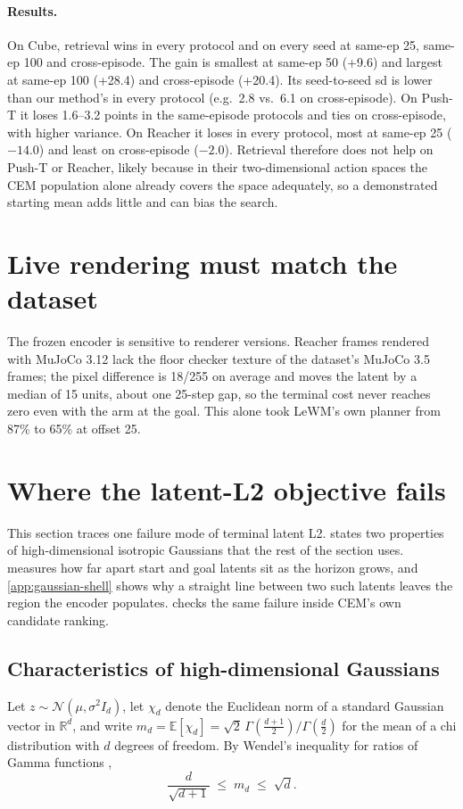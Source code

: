 \documentclass{article} %
\begin{document}
\paragraph{Results.} On Cube, retrieval wins in every protocol and on every seed at
same-ep 25, same-ep 100 and cross-episode. The gain is smallest at same-ep 50 (+9.6) and largest at
same-ep 100 (+28.4) and cross-episode (+20.4). Its seed-to-seed sd is lower than our method's in
every protocol (e.g.\ 2.8 vs.\ 6.1 on cross-episode). On Push-T it loses 1.6--3.2 points in the
same-episode protocols and ties on cross-episode, with higher variance. On Reacher it loses in
every protocol, most at same-ep 25 ($-14.0$) and least on cross-episode ($-2.0$). Retrieval therefore does not help on
Push-T or Reacher, likely because in their two-dimensional action spaces the CEM population
alone already covers the space adequately, so a demonstrated starting mean adds little and can
bias the search.


\section{Live rendering must match the dataset}
\label{app:render}
The frozen encoder is sensitive to renderer versions. Reacher frames rendered with MuJoCo 3.12
lack the floor checker texture of the dataset's MuJoCo 3.5 frames; the pixel difference is 18/255
on average and moves the latent by a median of 15 units, about one 25-step gap, so the terminal
cost never reaches zero even with the arm at the goal. This alone took LeWM's own planner from 87\%
to 65\% at offset 25. 


\section{Where the latent-L2 objective fails}
\label{app:lewm-failure}
This section traces one failure mode of terminal latent L2.  states two
properties of high-dimensional isotropic Gaussians that the rest of the section uses.
 measures how far apart start and goal latents sit as the horizon
grows, and \cref{app:gaussian-shell} shows why a straight line between two such latents leaves
the region the encoder populates.  checks the same failure inside CEM's own
candidate ranking.

\subsection{Characteristics of high-dimensional Gaussians}
\label{app:hd-gaussian}
Let $z\sim\mathcal N(\mu,\sigma^2 I_d)$, let $\chi_d$ denote the Euclidean norm of a standard
Gaussian vector in $\mathbb R^d$, and write $m_d=\mathbb E[\chi_d]=\sqrt2\,
\Gamma(\tfrac{d+1}{2})/\Gamma(\tfrac d2)$ for the mean of a chi distribution with $d$ degrees of
freedom. By Wendel's inequality for ratios of Gamma functions \citep{wendel1948note},
\begin{equation}
  \frac{d}{\sqrt{d+1}}\;\le\; m_d\;\le\;\sqrt d .
  \label{eq:chi-mean}
\end{equation}
\end{document}
